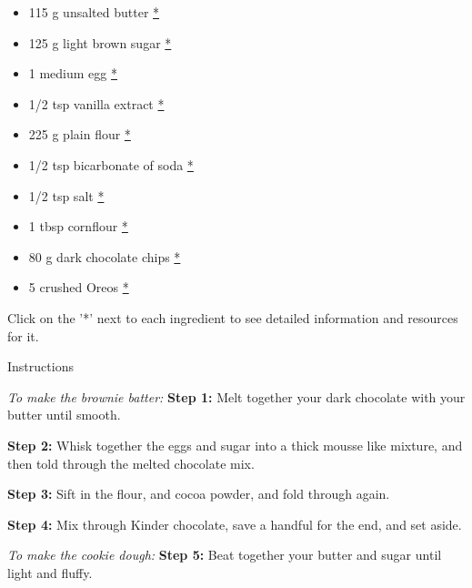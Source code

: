 \documentclass[
]{book}
\providecommand{\tightlist}{%
  \setlength{\itemsep}{0pt}\setlength{\parskip}{0pt}}
\begin{document}
\begin{itemize}
\tightlist
\item
  115 g unsalted butter
  \href{https://www.publix.com/pd/land-o-lakes-unsalted-butter-made-with-sweet-cream/RIO-PCI-112513?origin=search2}{*}
\item
  125 g light brown sugar
  \href{https://www.publix.com/pd/publix-sugar-light-brown/RIO-PCI-128825?origin=search1}{*}
\item
  1 medium egg
  \href{https://www.publix.com/pd/publix-eggs-large/RIO-PCI-145492?origin=search8}{*}
\item
  1/2 tsp vanilla extract
  \href{https://www.publix.com/pd/publix-vanilla-extract/RIO-PCI-110432?origin=search1}{*}
\item
  225 g plain flour
  \href{https://www.publix.com/pd/publix-all-purpose-flour/RIO-PCI-104014?origin=search1}{*}
\item
  1/2 tsp bicarbonate of soda
  \href{https://www.publix.com/pd/arm-and-hammer-baking-soda-pure/RIO-PCI-102907?origin=search1}{*}
\item
  1/2 tsp salt
  \href{https://www.publix.com/pd/morton-salt/RIO-PCI-103677?origin=search9}{*}
\item
  1 tbsp cornflour
  \href{https://www.publix.com/pd/argo-corn-starch/RIO-PCI-102788?origin=search7}{*}
\item
  80 g dark chocolate chips
  \href{https://www.publix.com/pd/lilys-baking-chips-dark-chocolate/RIO-PCI-541806?origin=search8}{*}
\item
  5 crushed Oreos
  \href{https://www.publix.com/pd/oreo-double-stuf-chocolate-sandwich-cookies-1403-oz/RIO-PCI-145118?origin=search4}{*}
\end{itemize}

Click on the '*' next to each ingredient to see detailed information and
resources for it.

Instructions

\emph{To make the brownie batter:} \textbf{Step 1:} Melt together your
dark chocolate with your butter until smooth.

\textbf{Step 2:} Whisk together the eggs and sugar into a thick mousse
like mixture, and then told through the melted chocolate mix.

\textbf{Step 3:} Sift in the flour, and cocoa powder, and fold through
again.

\textbf{Step 4:} Mix through Kinder chocolate, save a handful for the
end, and set aside.

\emph{To make the cookie dough:} \textbf{Step 5:} Beat together your
butter and sugar until light and fluffy.
\end{document}
